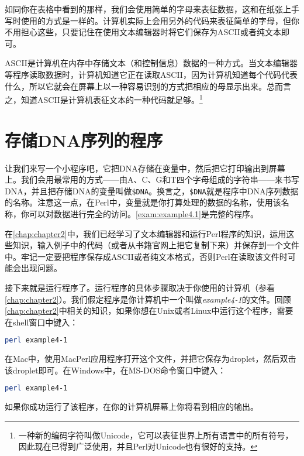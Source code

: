 如同你在表格中看到的那样，我们会使用简单的字母来表征数据，这和在纸张上手写时使用的方式是一样的。计算机实际上会用另外的代码来表征简单的字母，但你不用担心这些，只要记住在使用文本编辑器时将它们保存为ASCII或者纯文本即可。

ASCII是计算机在内存中存储文本（和控制信息）数据的一种方式。当文本编辑器等程序读取数据时，计算机知道它正在读取ASCII，因为计算机知道每个代码代表什么，所以它就会在屏幕上以一种容易识别的方式把相应的母显示出来。总而言之，知道ASCII是计算机表征文本的一种代码就足够。\footnote{一种新的编码字符叫做Unicode，它可以表征世界上所有语言中的所有符号，因此现在已得到广泛使用，并且Perl对Unicode也有很好的支持。}

\section{存储DNA序列的程序}
让我们来写一个小程序吧，它把DNA存储在变量中，然后把它打印输出到屏幕上。我们会用最常用的方式——由A、C、G和T四个字母组成的字符串——来书写DNA，并且把存储DNA的变量叫做\verb|$DNA|。换言之，\verb|$DNA|就是程序中DNA序列数据的名称。注意这一点，在Perl中，变量就是你打算处理的数据的名称，使用该名称，你可以对数据进行完全的访问。\autoref{exam:example4.1}是完整的程序。



在\autoref{chap:chapter2}中，我们已经学习了文本编辑器和运行Perl程序的知识，运用这些知识，输入例子中的代码（或者从书籍官网上把它复制下来）并保存到一个文件中。牢记一定要把程序保存成ASCII或者纯文本格式，否则Perl在读取该文件时可能会出现问题。

接下来就是运行程序了。运行程序的具体步骤取决于你使用的计算机（参看\autoref{chap:chapter2}）。我们假定程序是你计算机中一个叫做\textit{example4-1}的文件。回顾\autoref{chap:chapter2}中相关的知识，如果你想在Unix或者Linux中运行这个程序，需要在shell窗口中键入：

\begin{lstlisting}[language=bash]
perl example4-1
\end{lstlisting}

在Mac中，使用MacPerl应用程序打开这个文件，并把它保存为droplet，然后双击该droplet即可。在Windows中，在MS-DOS命令窗口中键入：

\begin{lstlisting}[language=bash]
perl example4-1
\end{lstlisting}

如果你成功运行了该程序，在你的计算机屏幕上你将看到相应的输出。

